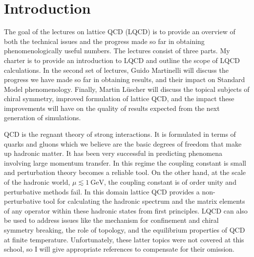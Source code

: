 
\chapter{Introduction}

The goal of the lectures on lattice QCD (LQCD) is to provide an overview
of both the technical issues and the progress made so far in obtaining
phenomenologically useful numbers. The lectures consist of three parts.
My charter is to provide an introduction to LQCD and outline the scope
of LQCD calculations. In the second set of lectures, Guido Martinelli will
discuss the progress we have made so far in obtaining results, and their
impact on Standard Model phenomenology. Finally, Martin L\"{u}scher will
discuss the topical subjects of chiral symmetry, improved formulation of
lattice QCD, and the impact these improvements will have on the quality
of results expected from the next generation of simulations.

QCD is the regnant theory of strong interactions. It is formulated in
terms of quarks and gluons which we believe are the basic degrees of
freedom that make up hadronic matter. It has been very successful in
predicting phenomena involving large momentum transfer. In this regime the
coupling constant is small and perturbation theory becomes a reliable tool.
On the other hand, at the scale of the hadronic world, $\mu \lesssim
1~\mathrm{GeV}$, the coupling constant is of order unity and perturbative
methods fail. In this domain lattice QCD provides a non-perturbative tool
for calculating the hadronic spectrum and the matrix elements of any
operator within these hadronic states from first principles. LQCD can also
be used to address issues like the mechanism for confinement and chiral
symmetry breaking, the role of topology, and the equilibrium properties of
QCD at finite temperature. Unfortunately, these latter topics were not
covered at this school, so I will give appropriate references to compensate
for their omission.


